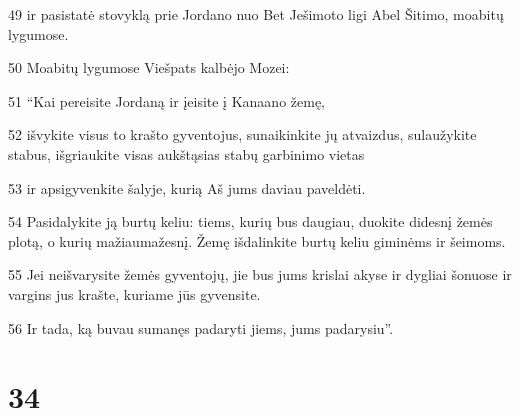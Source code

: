 \par 49 ir pasistatė stovyklą prie Jordano nuo Bet Ješimoto ligi Abel Šitimo, moabitų lygumose. 
\par 50 Moabitų lygumose Viešpats kalbėjo Mozei: 
\par 51 “Kai pereisite Jordaną ir įeisite į Kanaano žemę, 
\par 52 išvykite visus to krašto gyventojus, sunaikinkite jų atvaizdus, sulaužykite stabus, išgriaukite visas aukštąsias stabų garbinimo vietas 
\par 53 ir apsigyvenkite šalyje, kurią Aš jums daviau paveldėti. 
\par 54 Pasidalykite ją burtų keliu: tiems, kurių bus daugiau, duokite didesnį žemės plotą, o kurių mažiau­mažesnį. Žemę išdalinkite burtų keliu giminėms ir šeimoms. 
\par 55 Jei neišvarysite žemės gyventojų, jie bus jums krislai akyse ir dygliai šonuose ir vargins jus krašte, kuriame jūs gyvensite. 
\par 56 Ir tada, ką buvau sumanęs padaryti jiems, jums padarysiu”.



\chapter{34}


